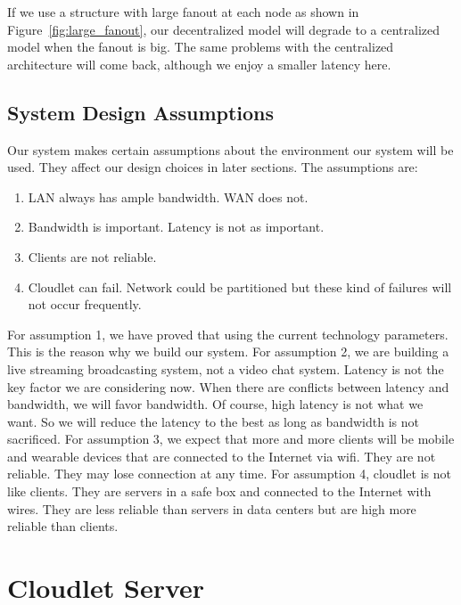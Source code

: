 \documentclass[letterpaper,twocolumn,10pt]{article}
\begin{document}
If we use a structure with large fanout at each node as shown in Figure~\ref{fig:large_fanout}, our decentralized model will degrade to a centralized model when the fanout is big. The same problems with the centralized architecture will come back, although we enjoy a smaller latency here.



\subsection{System Design Assumptions}

Our system makes certain assumptions about the environment our system will be used. They affect our design choices in later sections. The assumptions are:

\begin{enumerate}
  \item LAN always has ample bandwidth. WAN does not.
  \item Bandwidth is important. Latency is not as important.
  \item Clients are not reliable.
  \item Cloudlet can fail. Network could be partitioned but these kind of failures will not occur frequently.
\end{enumerate}

For assumption 1, we have proved that using the current technology parameters. This is the reason why we build our system. For assumption 2, we are building a live streaming broadcasting system, not a video chat system. Latency is not the key factor we are considering now. When there are conflicts between latency and bandwidth, we will favor bandwidth. Of course, high latency is not what we want. So we will reduce the latency to the best as long as bandwidth is not sacrificed. For assumption 3, we expect that more and more clients will be mobile and wearable devices that are connected to the Internet via wifi. They are not reliable. They may lose connection at any time. For assumption 4, cloudlet is not like clients. They are servers in a safe box and connected to the Internet with wires. They are less reliable than servers in data centers but are high more reliable than clients.

\section{Cloudlet Server}
\label{sec:cloudletServer}
\end{document}
